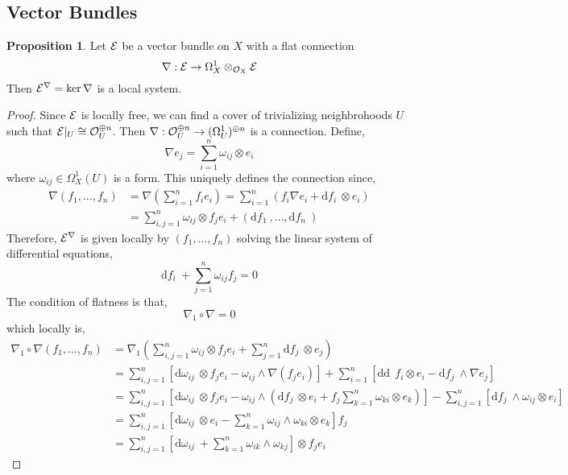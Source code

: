 \documentclass[12pt]{extarticle}
\renewcommand{\d}[1]{ \mathrm{d}#1 \:}
\theoremstyle{definition}
\newtheorem{proposition}[theorem]{Proposition}
\begin{document}
\subsection{Vector Bundles}


\begin{proposition}
Let $\mathcal{E}$ be a vector bundle on $X$ with a flat connection 
\[ \nabla : \mathcal{E} \to \Omega^1_X \otimes_{\mathcal{O}_{X}} \mathcal{E}   \]
Then $\mathcal{E}^\nabla = \ker{\nabla}$ is a local system. 
\end{proposition}

\begin{proof}
Since $\mathcal{E}$ is locally free, we can find a cover of trivializing neighbrohoods $U$ such that $\mathcal{E}|_U \cong \mathcal{O}_{U}^{\oplus n}$. Then $\nabla : \mathcal{O}_{U}^{\oplus n} \to (\Omega^1_U)^{\oplus n}$ is a connection. Define,
\[ \nabla e_j = \sum_{i = 1}^n \omega_{ij} \otimes e_i  \]
where $\omega_{ij} \in \Omega_X^1(U)$ is a form.
This uniquely defines the connection since,
\begin{align*}
\nabla (f_1, \dots, f_n) & = \nabla \left( \sum_{i = 1}^n f_i e_i \right) = \sum_{i = 1}^n \left( f_i \nabla e_i + \d{f_i} \otimes e_i \right)
\\
& = \sum_{i,j = 1}^n \omega_{ij} \otimes f_j e_i + (\d{f_1}, \dots, \d{f_n})
\end{align*}
Therefore, $\mathcal{E}^\nabla$ is given locally by $(f_1, \dots, f_n)$ solving the linear system of differential equations,
\[ \d{f_i} + \sum_{j = 1}^n \omega_{ij} f_j = 0 \]
The condition of flatness is that,
\[ \nabla_1 \circ \nabla = 0 \]
which locally is,
\begin{align*}
\nabla_1 \circ \nabla (f_1, \dots, f_n) & = \nabla_1 \left( \sum_{i,j = 1}^n \omega_{ij} \otimes f_j e_i + \sum_{j = 1}^n \d{f_j} \otimes e_j  \right) 
\\
& = \sum_{i,j = 1}^n \left[ \d{\omega_{ij}} \otimes f_j e_i - \omega_{ij} \wedge \nabla (f_j e_i) \right]  + \sum_{i = 1}^n \left[ \d \d f_i \otimes e_i - \d{f_j} \wedge \nabla e_j \right]
\\
& = \sum_{i,j = 1}^n \left[ \d{\omega_{ij}} \otimes f_j e_i - \omega_{ij} \wedge  \left(  \d{f_j} \otimes e_i  + f_j \sum_{k = 1}^n \omega_{ki} \otimes e_k \right) \right]  - \sum_{i,j = 1}^n \left[ \d{f_j} \wedge \omega_{ij} \otimes e_i  \right]
\\
& = \sum_{i,j = 1}^n  \left[ \d{\omega_{ij}} \otimes  e_i -  \sum_{k = 1}^n \omega_{ij} \wedge \omega_{ki} \otimes e_k \right] f_j
\\
& = \sum_{i,j = 1}^n \left[ \d{\omega_{ij}} + \sum_{k = 1}^n \omega_{ik} \wedge \omega_{kj} \right] \otimes f_j e_i

\end{align*}
\end{proof}
\end{document}
